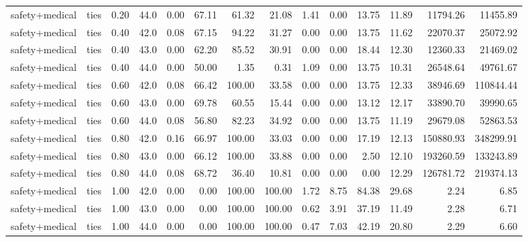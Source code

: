 \documentclass{article}
\begin{document}
\begin{table}[H]
{\begin{tabular}{llllrrrrrrrrrr}
safety+medical & ties & 0.20 & 44.0 & 0.00 & 67.11 & 61.32 & 21.08 & 1.41 & 0.00 & 13.75 & 11.89 & 11794.26 & 11455.89 \\
safety+medical & ties & 0.40 & 42.0 & 0.08 & 67.15 & 94.22 & 31.27 & 0.00 & 0.00 & 13.75 & 11.62 & 22070.37 & 25072.92 \\
safety+medical & ties & 0.40 & 43.0 & 0.00 & 62.20 & 85.52 & 30.91 & 0.00 & 0.00 & 18.44 & 12.30 & 12360.33 & 21469.02 \\
safety+medical & ties & 0.40 & 44.0 & 0.00 & 50.00 & 1.35 & 0.31 & 1.09 & 0.00 & 13.75 & 10.31 & 26548.64 & 49761.67 \\
safety+medical & ties & 0.60 & 42.0 & 0.08 & 66.42 & 100.00 & 33.58 & 0.00 & 0.00 & 13.75 & 12.33 & 38946.69 & 110844.44 \\
safety+medical & ties & 0.60 & 43.0 & 0.00 & 69.78 & 60.55 & 15.44 & 0.00 & 0.00 & 13.12 & 12.17 & 33890.70 & 39990.65 \\
safety+medical & ties & 0.60 & 44.0 & 0.08 & 56.80 & 82.23 & 34.92 & 0.00 & 0.00 & 13.75 & 11.19 & 29679.08 & 52863.53 \\
safety+medical & ties & 0.80 & 42.0 & 0.16 & 66.97 & 100.00 & 33.03 & 0.00 & 0.00 & 17.19 & 12.13 & 150880.93 & 348299.91 \\
safety+medical & ties & 0.80 & 43.0 & 0.00 & 66.12 & 100.00 & 33.88 & 0.00 & 0.00 & 2.50 & 12.10 & 193260.59 & 133243.89 \\
safety+medical & ties & 0.80 & 44.0 & 0.08 & 68.72 & 36.40 & 10.81 & 0.00 & 0.00 & 0.00 & 12.29 & 126781.72 & 219374.13 \\
safety+medical & ties & 1.00 & 42.0 & 0.00 & 0.00 & 100.00 & 100.00 & 1.72 & 8.75 & 84.38 & 29.68 & 2.24 & 6.85 \\
safety+medical & ties & 1.00 & 43.0 & 0.00 & 0.00 & 100.00 & 100.00 & 0.62 & 3.91 & 37.19 & 11.49 & 2.28 & 6.71 \\
safety+medical & ties & 1.00 & 44.0 & 0.00 & 0.00 & 100.00 & 100.00 & 0.47 & 7.03 & 42.19 & 20.80 & 2.29 & 6.60 \\
\bottomrule
\end{tabular}
}
\end{table}
\end{document}
